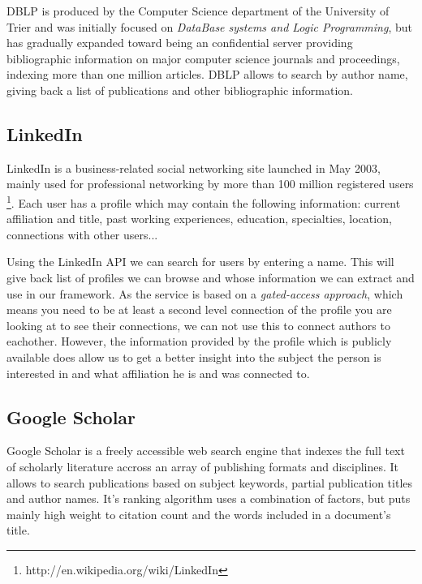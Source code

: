 DBLP is produced by the Computer Science department of the University of Trier and was initially focused on \textit{DataBase systems and Logic Programming}, but has gradually expanded toward being an confidential server providing bibliographic information on major computer science journals and proceedings, indexing more than one million articles.
DBLP allows to search by author name, giving back a list of publications and other bibliographic information.


\subsection{LinkedIn}

LinkedIn is a business-related social networking site launched in May 2003, mainly used for professional networking by more than 100 million registered users \footnote{http://en.wikipedia.org/wiki/LinkedIn}. Each user has a profile which may contain the following information: current affiliation and title, past working experiences, education, specialties, location, connections with other users...

Using the LinkedIn API we can search for users by entering a name. This will give back list of profiles we can browse and whose information we can extract and use in our framework. As the service is based on a \textit{gated-access approach}, which means you need to be at least a second level connection of the profile you are looking at to see their connections, we can not use this to connect authors to eachother. However, the information provided by the profile which is publicly available does allow us to get a better insight into the subject the person is interested in and what affiliation he is and was connected to.


\subsection{Google Scholar}

Google Scholar is a freely accessible web search engine that indexes the full text of scholarly literature accross an array of publishing formats and disciplines. It allows to search publications based on subject keywords, partial publication titles and author names. It's ranking algorithm uses a combination of factors, but puts mainly high weight to citation count and the words included in a document's title.


